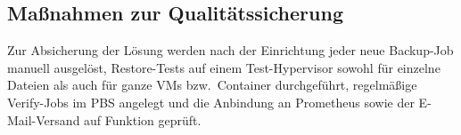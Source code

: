 \subsection{Maßnahmen zur Qualitätssicherung}
\label{sec:QS}
Zur Absicherung der Lösung werden nach der Einrichtung jeder neue
Backup-Job manuell ausgelöst, Restore-Tests auf einem Test-Hypervisor
sowohl für einzelne Dateien als auch für ganze \acp{VM} bzw.\
Container durchgeführt, regelmäßige Verify-Jobs im \ac{PBS} angelegt
und die Anbindung an Prometheus sowie der E-Mail-Versand auf
Funktion geprüft.

